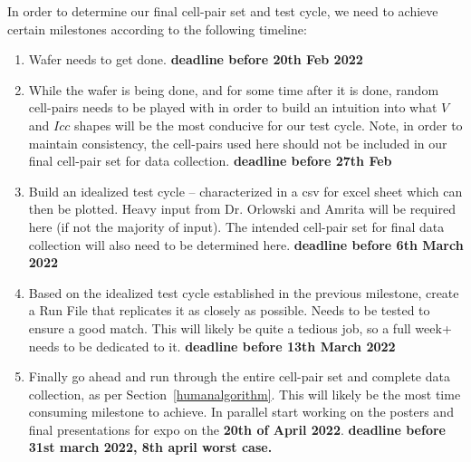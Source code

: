 \documentclass{article}
\begin{document}
        In order to determine our final cell-pair set and test cycle, we need to achieve certain milestones according to
        the following timeline:
        
        \begin{enumerate}
          \item Wafer needs to get done. \textbf{deadline before 20th Feb 2022}
          \item While the wafer is being done, and for some time after it is done, random cell-pairs needs to be played
            with in order to build an intuition into what $V$ and $Icc$ shapes will be the most conducive for our test
            cycle. Note, in order to maintain consistency, the cell-pairs used here should not be included in our final
            cell-pair set for data collection. \textbf{deadline before 27th Feb}
          \item Build an idealized test cycle -- characterized in a csv for excel sheet which can then be plotted. Heavy
            input from Dr. Orlowski and Amrita will be required here (if not the majority of input). The intended
            cell-pair set for final data collection will also need to be determined here. \textbf{deadline before 6th
            March 2022}
          \item Based on the idealized test cycle established in the previous milestone, create a Run File that
          replicates it as closely as possible. Needs to be tested to ensure a good match. This will likely be quite a
          tedious job, so a full week+ needs to be dedicated to it. \textbf{deadline before 13th March 2022}
          \item Finally go ahead and run through the entire cell-pair set and complete data collection, as per
            Section~\ref{humanalgorithm}. This will likely be the most time consuming milestone to achieve. In parallel
            start working on the posters and final presentations for expo on the \textbf{20th of April 2022}.
            \textbf{deadline before 31st march 2022, 8th april worst case.}
        \end{enumerate}
    
      
    
    
        
  
\end{document}
